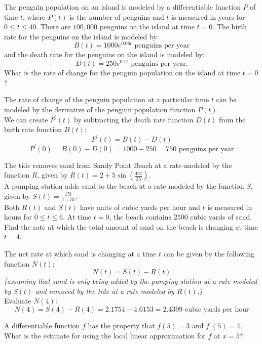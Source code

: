 \documentclass[12pt,letterpaper, onecolumn]{exam}
\begin{document}
\begin{questions}
\question
The penguin population on an island is modeled by a differentiable function $P$ of time $t$, where $P(t)$ is the number of penguins and $t$ is measured in years for $0 \leq t \leq 40$. There are $100,000$ penguins on the island at time $t = 0$. The birth rate for the penguins on the island is modeled by:
$$B(t) = 1000e^{0.06t} \text{ penguins per year}$$ 
and the death rate for the penguins on the island is modeled by:
$$D(t)=250e^{0.1t} \text{ penguins per year.}$$
What is the rate of change for the penguin population on the island at time $t = 0$?
\begin{solution}
	The rate of change of the penguin population at a particular time $t$ can be modeled by the derivative of the penguin population function $P(t)$. \\
	We can create $P^\prime(t)$ by subtracting the death rate function $D(t)$ from the birth rate function $B(t)$:
	$$P^\prime(t)=B(t)-D(t)$$
	$$P^\prime(0)=B(0)-D(0) = 1000-250 = \boxed{750 \text{ penguins per year}}$$
\end{solution}


\question
The tide removes sand from Sandy Point Beach at a rate modeled by the function $R$, given by $R(t)=2+5\sin(\frac{4\pi t}{25})$. \\
A pumping station adds sand to the beach at a rate modeled by the function $S$, given by $S(t)=\frac{15t}{1+3t}$. \\
Both $R(t)$ and $S(t)$ have units of cubic yards per hour and $t$ is measured in hours for $0 \leq t \leq 6$. At time $t = 0$, the beach contains $2500$ cubic yards of sand. \\
Find the rate at which the total amount of sand on the beach is changing at time $t = 4$.

\begin{solution}
	The net rate at which sand is changing at a time $t$ can be given by the following function $N(t)$:
	$$N(t)=S(t)-R(t)$$
	\emph{(assuming that sand is only being added by the pumping station at a rate modeled by $S(t)$ and removed by the tide at a rate modeled by $R(t)$.)} \\
	Evaluate $N(4)$:
	$$N(4)=S(4)-R(4)=2.1754-4.6153=\boxed{2.4399 \text{ cubic yards per hour}}$$
\end{solution}

\question
A differentiable function $f$ has the property that $f(5)=3$ and $f^\prime(5)=4$. What is the estimate for 
using the local linear approximation for $f$ at $x = 5$?


\end{questions}
\end{document}
